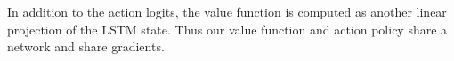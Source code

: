\documentclass[ocean-paper.tex]{subfiles}
\begin{document}
In addition to the action logits, the value function is computed as another linear projection of the LSTM state. 
Thus our value function and action policy share a network and share gradients. 
\end{document}
